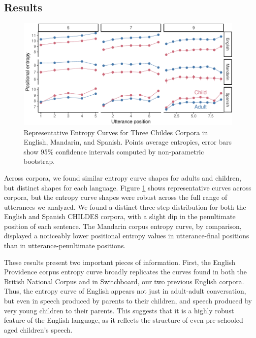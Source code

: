 \documentclass[10pt, letterpaper]{article}
\newenvironment{CodeChunk}{}{}
\begin{document}
\subsection{Results}\label{results-1}

\begin{CodeChunk}
\begin{figure}[tb]

{\centering \includegraphics{figs/plot_childes-1} 

}

\caption[Representative Entropy Curves for Three Childes Corpora in English, Mandarin, and Spanish]{Representative Entropy Curves for Three Childes Corpora in English, Mandarin, and Spanish. Points average entropies, error bars show 95\% confidence intervals computed by non-parametric bootstrap.}\label{fig:plot_childes}
\end{figure}
\end{CodeChunk}

Across corpora, we found similar entropy curve shapes for adults and
children, but distinct shapes for each language. Figure
\ref{fig:plot_childes} shows representative curves across corpora, but
the entropy curve shapes were robust across the full range of utterances
we analyzed. We found a distinct three-step distribution for both the
English and Spanish CHILDES corpora, with a slight dip in the
penultimate position of each sentence. The Mandarin corpus entropy
curve, by comparison, displayed a noticeably lower positional entropy
values in utterance-final positions than in utterance-penultimate
positions.

These results present two important pieces of information. First, the
English Providence corpus entropy curve broadly replicates the curves
found in both the British National Corpus and in Switchboard, our two
previous English corpora. Thus, the entropy curve of English appears not
just in adult-adult conversation, but even in speech produced by parents
to their children, and speech produced by very young children to their
parents. This suggests that it is a highly robust feature of the English
language, as it reflects the structure of even pre-schooled aged
children's speech.
\end{document}
